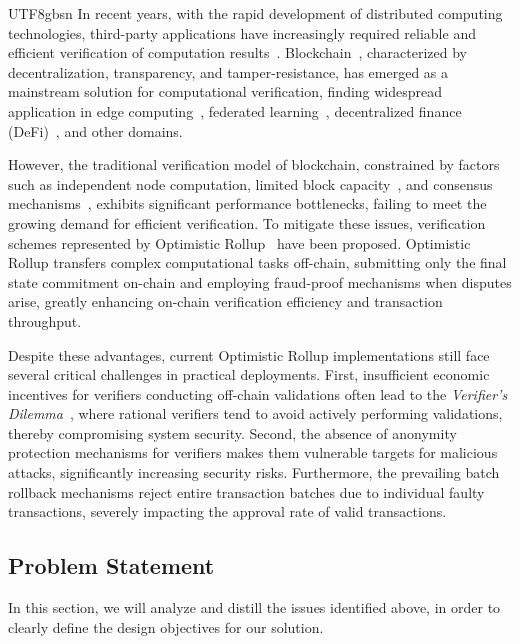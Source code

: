 \documentclass[runningheads]{llncs}
\begin{document}
\begin{CJK*}{UTF8}{gbsn}
In recent years, with the rapid development of distributed computing technologies, third-party applications have increasingly required reliable and efficient verification of computation results~\cite{du2001privacy, kissner2005privacy, backes2016reliable, mcallister2012regulation, setty2012taking, yu2017survey}.  Blockchain~\cite{blk1,blk2,blk3}, characterized by decentralization, transparency, and tamper-resistance, has emerged as a mainstream solution for computational verification, finding widespread application in edge computing~\cite{edge1,edge2,edge3}, federated learning~\cite{fed1,fed2,fed3}, decentralized finance (DeFi)~\cite{defi1}, and other domains.

However, the traditional verification model of blockchain, constrained by factors such as independent node computation, limited block capacity~\cite{size1,size2}, and consensus mechanisms~\cite{con1,con2,con3,con4}, exhibits significant performance bottlenecks, failing to meet the growing demand for efficient verification. To mitigate these issues, verification schemes represented by Optimistic Rollup~\cite{op1,op2} have been proposed. Optimistic Rollup transfers complex computational tasks off-chain, submitting only the final state commitment on-chain and employing fraud-proof mechanisms when disputes arise, greatly enhancing on-chain verification efficiency and transaction throughput.

Despite these advantages, current Optimistic Rollup implementations still face several critical challenges in practical deployments. First, insufficient economic incentives for verifiers conducting off-chain validations often lead to the \emph{Verifier's Dilemma}~\cite{dilemma,dilemma1}, where rational verifiers tend to avoid actively performing validations, thereby compromising system security. Second, the absence of anonymity protection mechanisms for verifiers makes them vulnerable targets for malicious attacks, significantly increasing security risks. Furthermore, the prevailing batch rollback mechanisms reject entire transaction batches due to individual faulty transactions, severely impacting the approval rate of valid transactions.

\subsection{Problem Statement}

In this section, we will analyze and distill the issues identified above, in order to clearly define the design objectives for our solution.


\end{CJK*}
\end{document}

